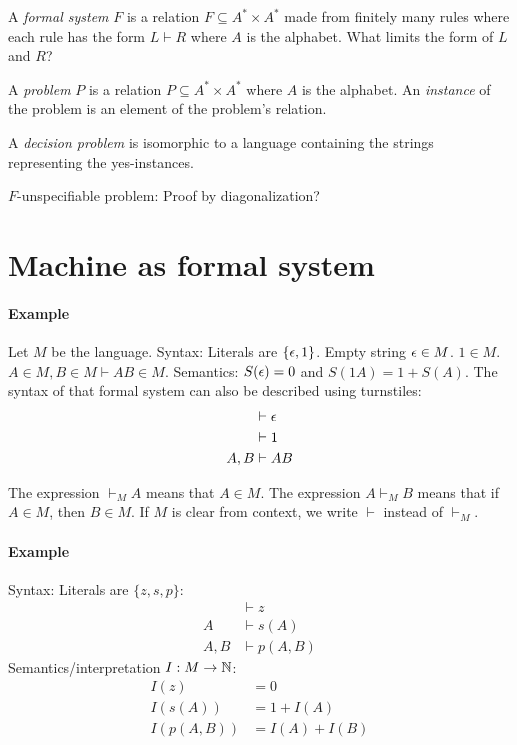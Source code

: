 A
%
\emph{formal system} \(F\) is a relation \(F \subseteq A^* \times A^*\)
made from finitely many rules where each rule has the form \(L \vdash R\)
where \(A\) is the alphabet.
What limits the form of \(L\) and \(R\)?

A
%
\emph{problem} \(P\) is a relation \(P \subseteq A^* \times A^*\) where \(A\) is the alphabet.
An \emph{instance} of the problem is an element of the problem's relation.

A
%
%
\emph{decision problem} is isomorphic to a language
containing the strings representing the yes-instances.

\(F\)-unspecifiable problem:
Proof by diagonalization?

\section{Machine as formal system}

\paragraph{Example}
Let \(M\) be the language.
Syntax:
Literals are \(\{\epsilon, 1\}\).
Empty string \(\epsilon \in M\).
\(1 \in M\).
\(A \in M, B \in M \vdash AB \in M\).
Semantics: \(S(\epsilon) = 0\) and \(S(1A) = 1 + S(A)\).
The syntax of that formal system can also be described using turnstiles:
\begin{align*}
    &\vdash \epsilon
    \\
    &\vdash 1
    \\
    A,B &\vdash AB
\end{align*}

The expression \(\vdash_M A\) means that \(A \in M\).
The expression \(A \vdash_M B\) means that if \(A \in M\), then \(B \in M\).
If \(M\) is clear from context, we write \(\vdash\) instead of \(\vdash_M\).

\paragraph{Example}
Syntax:
Literals are \(\{z,s,p\}\):
\begin{align*}
    &\vdash z
    \\
    A &\vdash s(A)
    \\
    A,B &\vdash p(A,B)
\end{align*}
Semantics/interpretation \(I : M \to \mathbb{N}\):
\begin{align*}
    I(z) &= 0
    \\
    I(s(A)) &= 1 + I(A)
    \\
    I(p(A,B)) &= I(A) + I(B)
\end{align*}

